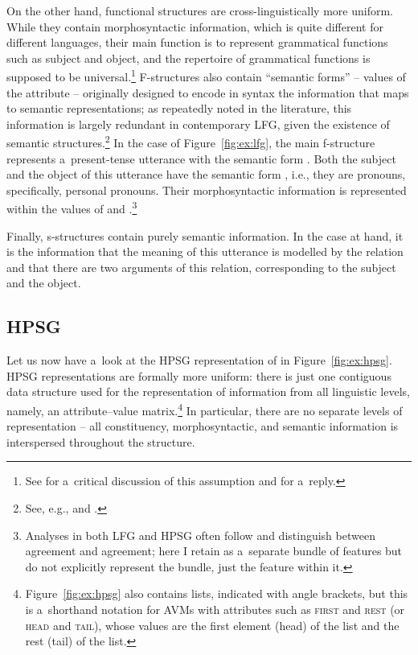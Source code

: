 \documentclass[output=paper,hidelinks]{langscibook}
\begin{document}
On the other hand, functional structures are cross\hyp{}linguistically more uniform.  While they contain morphosyntactic information, which is quite different for different languages, their main function is to represent grammatical functions such as subject and object, and the repertoire of grammatical functions is supposed to be universal.\footnote{See \citet{patejuk2016reducing} for a~critical discussion of this assumption and \citet{kapl:17} for a~reply.}  F-structures also contain “semantic forms” -- values of the \PRED attribute -- originally designed to encode in syntax the information that maps to semantic representations; as repeatedly noted in the literature, this information is largely redundant in contemporary LFG, given the existence of semantic structures.\footnote{See, e.g., \citet[13--14]{dal:etal:93} and \citet[Sections {1.3.3,\,1.4.1}]{kuhn2001}.}  In the case of Figure~\ref{fig:ex:lfg}, the main f-structure represents a~present\hyp{}tense utterance with the semantic form .  Both the subject and the object of this utterance have the semantic form , i.e., they are pronouns, specifically, personal pronouns.  Their morphosyntactic information is represented within the values of \CASE and \NINDEX.\footnote{Analyses in both LFG and HPSG often follow \citet{WechslerZlatic:Agreement2003} and distinguish between \NINDEX agreement and \CONCORD agreement; here I retain \NINDEX as a~separate bundle of features but do not explicitly represent the \CONCORD bundle, just the \CASE feature within it.}

Finally, s-structures contain purely semantic information.  In the case at hand, it is the information that the meaning of this utterance is modelled by the relation  and that there are two arguments of this relation, corresponding to the subject and the object.

\subsection{HPSG}
\label{sec:arch:hpsg}

Let us now have a~look at the HPSG representation of  in Figure~\ref{fig:ex:hpsg}. HPSG representations are formally more uniform: there is just one contiguous data structure used for the representation of information from all linguistic levels, namely, an attribute--value matrix.\footnote{Figure~\ref{fig:ex:hpsg} also contains lists, indicated with angle brackets, but this is a~shorthand notation for AVMs with attributes such as \textsc{first} and \textsc{rest} (or \textsc{head} and \textsc{tail}), whose values are the first element (head) of the list and the rest (tail) of the list.}   In particular, there are no separate levels of representation -- all constituency, morphosyntactic, and semantic information is interspersed throughout the structure.  
 
\end{document}
